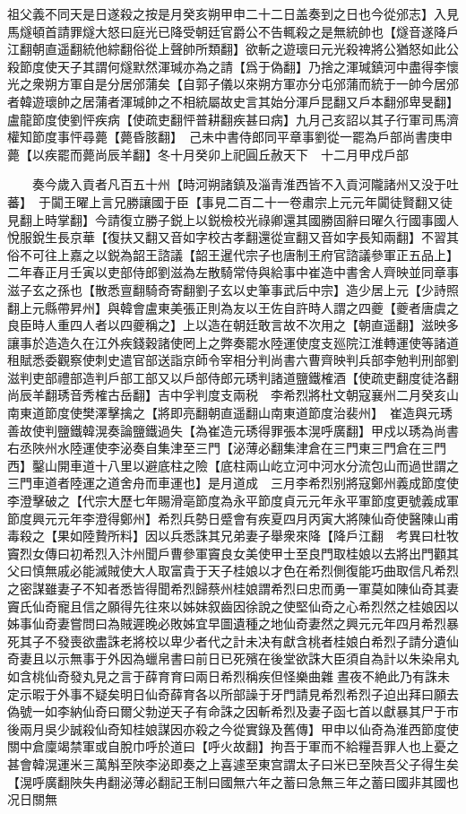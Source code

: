 祖父義不同天是日遂殺之按是月癸亥朔甲申二十二日盖奏到之日也今從邠志】入見馬燧頓首請罪燧大怒曰庭光已降受朝廷官爵公不告輒殺之是無統帥也【燧音遂降戶江翻朝直遥翻統他綜翻俗從上聲帥所類翻】欲斬之遊瓌曰元光殺禆將公猶怒如此公殺節度使天子其謂何燧默然渾瑊亦為之請【爲于偽翻】乃捨之渾瑊鎮河中盡得李懷光之衆朔方軍自是分居邠蒲矣【自郭子儀以來朔方軍亦分屯邠蒲而統于一帥今居邠者韓遊瓌帥之居蒲者渾瑊帥之不相統屬故史言其始分渾戶昆翻又戶本翻邠卑旻翻】　盧龍節度使劉怦疾病【使疏吏翻怦普耕翻疾甚曰病】九月己亥詔以其子行軍司馬濟權知節度事怦尋薨【薨昏胲翻】　己未中書侍郎同平章事劉從一罷為戶部尚書庚申薨【以疾罷而薨尚辰羊翻】冬十月癸卯上祀圓丘赦天下　十二月甲戍戶部

　　奏今歲入貢者凡百五十州【時河朔諸鎮及淄青淮西皆不入貢河隴諸州又没于吐蕃】　于闐王曜上言兄勝讓國于臣【事見二百二十一卷肅宗上元元年闐徒賢翻又徒見翻上時掌翻】今請復立勝子鋭上以鋭檢校光祿卿還其國勝固辭曰曜久行國事國人悅服銳生長京華【復扶又翻又音如字校古孝翻還從宣翻又音如字長知兩翻】不習其俗不可往上嘉之以鋭為韶王諮議【韶王暹代宗子也唐制王府官諮議參軍正五品上】二年春正月壬寅以吏部侍郎劉滋為左散騎常侍與給事中崔造中書舍人齊映並同章事滋子玄之孫也【散悉亶翻騎奇寄翻劉子玄以史筆事武后中宗】造少居上元【少詩照翻上元縣帶昇州】與韓會盧東美張正則為友以王佐自許時人謂之四夔【夔者唐虞之良臣時人重四人者以四夔稱之】上以造在朝廷敢言故不次用之【朝直遥翻】滋映多讓事於造造久在江外疾錢穀諸使罔上之弊奏罷水陸運使度支廵院江淮轉運使等諸道租賦悉委觀察使刺史遣官部送詣京師令宰相分判尚書六曹齊映判兵部李勉判刑部劉滋判吏部禮部造判戶部工部又以戶部侍郎元琇判諸道鹽鐵榷酒【使疏吏翻度徒洛翻尚辰羊翻琇音秀榷古岳翻】吉中孚判度支兩税　李希烈將杜文朝寇襄州二月癸亥山南東道節度使樊澤擊擒之【將即亮翻朝直遥翻山南東道節度治裴州】　崔造與元琇善故使判鹽鐵韓滉奏論鹽鐵過失【為崔造元琇得罪張本滉呼廣翻】甲戍以琇為尚書右丞陜州水陸運使李泌奏自集津至三門【泌薄必翻集津倉在三門東三門倉在三門西】鑿山開車道十八里以避底柱之險【底柱兩山屹立河中河水分流包山而過世謂之三門車道者陸運之道舍舟而車運也】是月道成　三月李希烈别將寇鄭州義成節度使李澄擊破之【代宗大歷七年賜滑亳節度為永平節度貞元元年永平軍節度更號義成軍節度興元元年李澄得鄭州】希烈兵勢日蹙會有疾夏四月丙寅大將陳仙奇使醫陳山甫毒殺之【果如陸贄所料】因以兵悉誅其兄弟妻子舉衆來降【降戶江翻　考異曰杜牧竇烈女傳曰初希烈入汴州聞戶曹參軍竇良女美使甲士至良門取桂娘以去將出門顴其父曰慎無戚必能滅賊使大人取富貴于天子桂娘以才色在希烈側復能巧曲取信凡希烈之密謀雖妻子不知者悉皆得聞希烈歸蔡州桂娘謂希烈曰忠而勇一軍莫如陳仙奇其妻竇氏仙奇寵且信之願得先往來以姊妹叙齒因徐說之使堅仙奇之心希烈然之桂娘因以姊事仙奇妻嘗問曰為賊遲晚必敗姊宜早圖遺種之地仙奇妻然之興元元年四月希烈暴死其子不發喪欲盡誅老將校以卑少者代之計未决有獻含桃者桂娘白希烈子請分遺仙奇妻且以示無事于外因為蠟帛書曰前日已死殯在後堂欲誅大臣須自為計以朱染帛丸如含桃仙奇發丸見之言于薛育育曰兩日希烈稱疾但怪樂曲雜晝夜不絶此乃有誅未定示暇于外事不疑矣明日仙奇薛育各以所部譟于牙門請見希烈希烈子迫出拜曰願去偽號一如李納仙奇曰爾父勃逆天子有命誅之因斬希烈及妻子函七首以獻暴其尸于市後兩月吳少誠殺仙奇知桂娘謀因亦殺之今從實錄及舊傳】甲申以仙奇為淮西節度使　關中倉廩竭禁軍或自脫巾呼於道曰【呼火故翻】拘吾于軍而不給糧吾罪人也上憂之甚會韓滉運米三萬斛至陜李泌即奏之上喜遽至東宫謂太子曰米已至陜吾父子得生矣【滉呼廣翻陜失冉翻泌薄必翻記王制曰國無六年之蓄曰急無三年之蓄曰國非其國也况日關無
